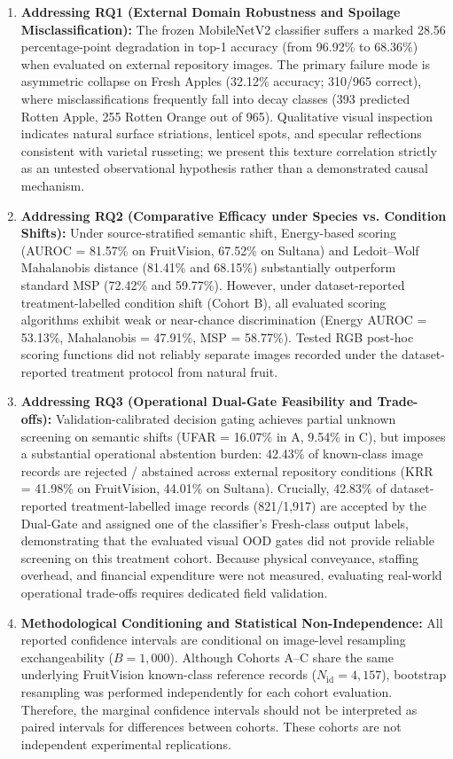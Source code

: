 \begin{enumerate}
\setlength{\itemsep}{0pt}
\setlength{\parsep}{0pt}
\setlength{\parskip}{0pt}
\setlength{\topsep}{1pt}
\setlength{\partopsep}{0pt}
\item \textbf{Addressing RQ1 (External Domain Robustness and Spoilage Misclassification):} The frozen MobileNetV2 classifier suffers a marked 28.56 percentage-point degradation in top-1 accuracy (from 96.92\% to 68.36\%) when evaluated on external repository images. The primary failure mode is asymmetric collapse on Fresh Apples (32.12\% accuracy; 310/965 correct), where misclassifications frequently fall into decay classes (393 predicted Rotten Apple, 255 Rotten Orange out of 965). Qualitative visual inspection indicates natural surface striations, lenticel spots, and specular reflections consistent with varietal russeting; we present this texture correlation strictly as an untested observational hypothesis rather than a demonstrated causal mechanism.
\item \textbf{Addressing RQ2 (Comparative Efficacy under Species vs. Condition Shifts):} Under source-stratified semantic shift, Energy-based scoring (AUROC = 81.57\% on FruitVision, 67.52\% on Sultana) and Ledoit--Wolf Mahalanobis distance (81.41\% and 68.15\%) substantially outperform standard MSP (72.42\% and 59.77\%). However, under dataset-reported treatment-labelled condition shift (Cohort B), all evaluated scoring algorithms exhibit weak or near-chance discrimination (Energy AUROC = 53.13\%, Mahalanobis = 47.91\%, MSP = 58.77\%). Tested RGB post-hoc scoring functions did not reliably separate images recorded under the dataset-reported treatment protocol from natural fruit.
\item \textbf{Addressing RQ3 (Operational Dual-Gate Feasibility and Trade-offs):} Validation-calibrated decision gating achieves partial unknown screening on semantic shifts (UFAR = 16.07\% in A, 9.54\% in C), but imposes a substantial operational abstention burden: 42.43\% of known-class image records are rejected / abstained across external repository conditions (KRR = 41.98\% on FruitVision, 44.01\% on Sultana). Crucially, 42.83\% of dataset-reported treatment-labelled image records (821/1,917) are accepted by the Dual-Gate and assigned one of the classifier's Fresh-class output labels, demonstrating that the evaluated visual OOD gates did not provide reliable screening on this treatment cohort. Because physical conveyance, staffing overhead, and financial expenditure were not measured, evaluating real-world operational trade-offs requires dedicated field validation.
\item \textbf{Methodological Conditioning and Statistical Non-Independence:} All reported confidence intervals are conditional on image-level resampling exchangeability ($B = 1,000$). Although Cohorts A--C share the same underlying FruitVision known-class reference records ($N_{\text{id}} = 4,157$), bootstrap resampling was performed independently for each cohort evaluation. Therefore, the marginal confidence intervals should not be interpreted as paired intervals for differences between cohorts. These cohorts are not independent experimental replications.
\end{enumerate}
